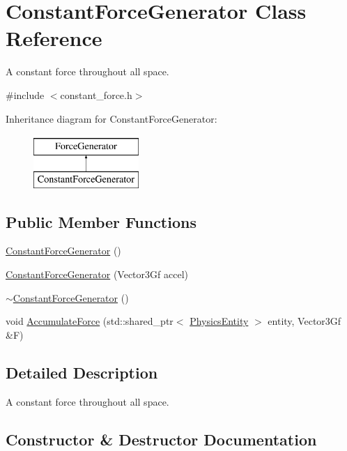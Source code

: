 \hypertarget{classConstantForceGenerator}{}\section{Constant\+Force\+Generator Class Reference}
\label{classConstantForceGenerator}


A constant force throughout all space.  




{\ttfamily \#include $<$constant\+\_\+force.\+h$>$}

Inheritance diagram for Constant\+Force\+Generator\+:\begin{figure}[H]
\begin{center}
\leavevmode
\includegraphics[height=2.000000cm]{classConstantForceGenerator}
\end{center}
\end{figure}
\subsection*{Public Member Functions}
\begin{DoxyCompactItemize}
\item 
\hyperlink{classConstantForceGenerator_a1313aa10929f00280d1f3d5e961f7352}{Constant\+Force\+Generator} ()
\item 
\hyperlink{classConstantForceGenerator_a6ff2c05d06addf1859a604c6dbb8f9bd}{Constant\+Force\+Generator} (Vector3\+Gf accel)
\item 
\hyperlink{classConstantForceGenerator_a3563efee2f73fd5c2e504db89b4d3767}{$\sim$\+Constant\+Force\+Generator} ()
\item 
void \hyperlink{classConstantForceGenerator_a6a50c67567de9d26073a373aed77d29f}{Accumulate\+Force} (std\+::shared\+\_\+ptr$<$ \hyperlink{classPhysicsEntity}{Physics\+Entity} $>$ entity, Vector3\+Gf \&F)
\end{DoxyCompactItemize}


\subsection{Detailed Description}
A constant force throughout all space. 

\subsection{Constructor \& Destructor Documentation}
\mbox{\label{classConstantForceGenerator_a1313aa10929f00280d1f3d5e961f7352}} 
